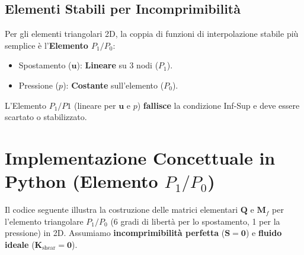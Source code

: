 \documentclass{article}
\begin{document}
\subsection{Elementi Stabili per Incomprimibilità}

Per gli elementi triangolari 2D, la coppia di funzioni di interpolazione stabile più semplice è l'\textbf{Elemento $P_1/P_0$}:
\begin{itemize}
    \item Spostamento ($\mathbf{u}$): \textbf{Lineare} su 3 nodi ($P_1$).
    \item Pressione ($p$): \textbf{Costante} sull'elemento ($P_0$).
\end{itemize}
L'Elemento $P_1/P1$ (lineare per $\mathbf{u}$ e $p$) \textbf{fallisce} la condizione Inf-Sup e deve essere scartato o stabilizzato.

\section{Implementazione Concettuale in Python (Elemento $P_1/P_0$)}

Il codice seguente illustra la costruzione delle matrici elementari $\mathbf{Q}$ e $\mathbf{M}_f$ per l'elemento triangolare $P_1/P_0$ (6 gradi di libertà per lo spostamento, 1 per la pressione) in 2D. Assumiamo \textbf{incomprimibilità perfetta} ($\mathbf{S}=\mathbf{0}$) e \textbf{fluido ideale} ($\mathbf{K}_{\text{shear}}=\mathbf{0}$).
\end{document}
